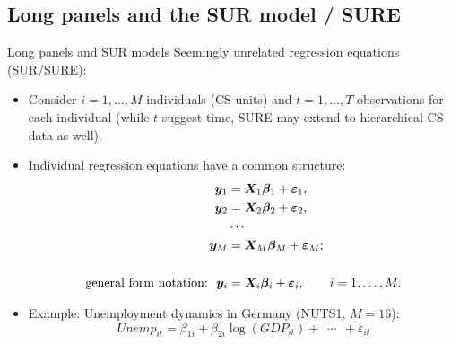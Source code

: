 \documentclass[usenames,dvipsnames]{beamer}
\begin{document}
\subsection*{Long panels and the SUR model / SURE}
\begin{frame}{Long panels and SUR models}
\small
Seemingly unrelated regression equations (SUR/SURE):\\ \medskip
\begin{itemize}
    \item Consider $i=1,\dots,M$ individuals (CS units) and $t=1,\dots,T$ observations for each individual (while $t$ suggest time, SURE may extend to hierarchical CS data as well).\\
    \bigskip
    \item Individual regression equations have a common structure: 
    \begin{align*}
        \bm{y}_1 &= \bm{X}_1 \bm{\beta}_1 + \bm{\varepsilon}_1, \\
        \bm{y}_2 &= \bm{X}_2 \bm{\beta}_2 + \bm{\varepsilon}_2, \\
        &\cdots \\
        \bm{y}_M &= \bm{X}_M \bm{\beta}_M + \bm{\varepsilon}_M;\\
        &~ \\
        \textnormal{general form notation:~~} \bm{y}_i &= \bm{X}_i \bm{\beta}_i + \bm{\varepsilon}_i,\qquad i = 1,\dots,M.
    \end{align*}
    \footnotesize
    \item Example: Unemployment dynamics in Germany (NUTS1, $M=16$):
    $$\textit{Unemp}_{it}  = \beta_{1i} + \beta_{2i} \log (\textit{GDP}_{it}) +~~ \cdots~~ + \varepsilon_{it}$$
    
\end{itemize}
\end{frame}
\end{document}
